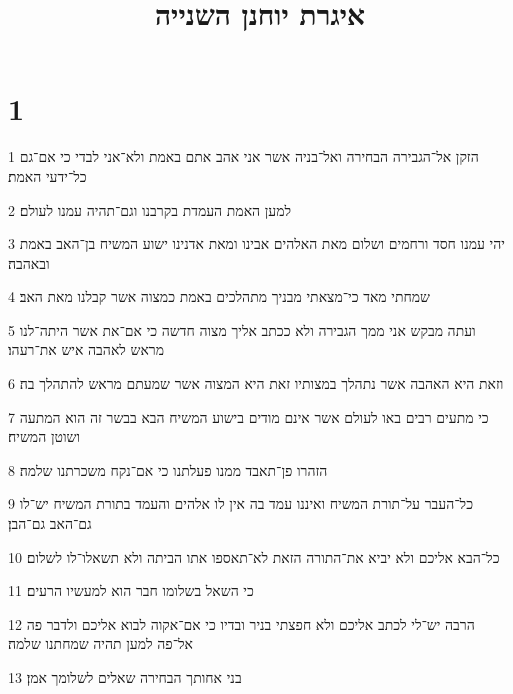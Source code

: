 

\title{איגרת יוחנן השנייה}


\chapter{1}

\par 1 הזקן אל־הגבירה הבחירה ואל־בניה אשר אני אהב אתם באמת ולא־אני לבדי כי אם־גם כל־ידעי האמת׃
\par 2 למען האמת העמדת בקרבנו וגם־תהיה עמנו לעולם׃
\par 3 יהי עמנו חסד ורחמים ושלום מאת האלהים אבינו ומאת אדנינו ישוע המשיח בן־האב באמת ובאהבה׃
\par 4 שמחתי מאד כי־מצאתי מבניך מתהלכים באמת כמצוה אשר קבלנו מאת האב׃
\par 5 ועתה מבקש אני ממך הגבירה ולא ככתב אליך מצוה חדשה כי אם־את אשר היתה־לנו מראש לאהבה איש את־רעהו׃
\par 6 וזאת היא האהבה אשר נתהלך במצותיו זאת היא המצוה אשר שמעתם מראש להתהלך בה׃
\par 7 כי מתעים רבים באו לעולם אשר אינם מודים בישוע המשיח הבא בבשר זה הוא המתעה ושוטן המשיח׃
\par 8 הזהרו פן־תאבד ממנו פעלתנו כי אם־נקח משכרתנו שלמה׃
\par 9 כל־העבר על־תורת המשיח ואיננו עמד בה אין לו אלהים והעמד בתורת המשיח יש־לו גם־האב גם־הבן׃
\par 10 כל־הבא אליכם ולא יביא את־התורה הזאת לא־תאספו אתו הביתה ולא תשאלו־לו לשלום׃
\par 11 כי השאל בשלומו חבר הוא למעשיו הרעים׃
\par 12 הרבה יש־לי לכתב אליכם ולא חפצתי בניר ובדיו כי אם־אקוה לבוא אליכם ולדבר פה אל־פה למען תהיה שמחתנו שלמה׃
\par 13 בני אחותך הבחירה שאלים לשלומך אמן׃


